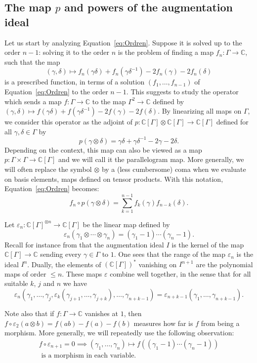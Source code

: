 \documentclass[JEP,XML,SOM,Unicode,NoEqCountersInSection]{cedram}
\theoremstyle{definition}
\newcommand{\CC}{\mathbb{C}}
\begin{document}
\subsection{The map $p$ and powers of the augmentation ideal}

Let us start by analyzing Equation~\eqref{eq:Ordren}. Suppose it is solved
up to the order
$n-1$: solving it to the order
$n$ is the problem of finding
a map $f_n\colon\Gamma\to\CC$, such that the map
\[ (\gamma,\delta)\mapsto f_n(\gamma\delta)+f_n(\gamma\delta^{-1})
-2f_n(\gamma)-2f_n(\delta) \]
is a prescribed function, in terms of a solution
$(f_1,\ldots,f_{n-1})$ of
Equation~\eqref{eq:Ordren} to the order $n-1$.
This suggests to study the operator
which sends a map $f\colon\Gamma\to\CC$ to the map $\Gamma^2\to\CC$ defined by
$(\gamma,\delta)\mapsto f(\gamma\delta)+f(\gamma\delta^{-1})-2f(\gamma)
-2f(\delta)$.
By linearizing all maps on $\Gamma$, we consider this operator as the
adjoint of
$p:\CC[\Gamma]\otimes\CC[\Gamma]\to\CC[\Gamma]$ defined for all
$\gamma,\delta\in \Gamma$ by
\[ p(\gamma\otimes\delta)=\gamma\delta+\gamma\delta^{-1}-2\gamma-2\delta. \]
Depending on the context, this map can also be viewed as a map
$p:\Gamma\times \Gamma\to\CC[\Gamma]$ and we will call it the parallelogram
map. More generally, we will often replace the symbol
$\otimes$ by a (less cumbersome) coma when we evaluate on basis elements,
maps defined on tensor products.
With this notation, Equation~\eqref{eq:Ordren} becomes:
\begin{equation}\label{eq:Oordren}
f_n\circ p(\gamma\otimes\delta) =
\sum_{k=1}^{n-1}f_k(\gamma)f_{n-k}(\delta).
\end{equation}

Let $\varepsilon_n\colon\CC[\Gamma]^{\otimes n}\to\CC[\Gamma]$ be the
linear map defined by
\[ \varepsilon_n(\gamma_1\otimes\cdots\otimes\gamma_n)
=(\gamma_1-1)\cdots(\gamma_n-1). \]
Recall for instance from \cite{Passi} that the augmentation ideal $I$ is the
kernel of the map $\CC[\Gamma]\to\CC$ sending every $\gamma\in \Gamma$ to $1$.
One sees that the range of the map $\varepsilon_n$ is the ideal $I^n$.
Dually, the elements of $(\CC[\Gamma])^*$ vanishing on $I^{n+1}$ are the
polynomial maps of order $\leq n$.
These maps $\varepsilon$ combine well together, in the sense that for all
suitable $k$, $j$ and $n$ we have
\[
\varepsilon_n(\gamma_1,\dots,\gamma_j,
\varepsilon_k(\gamma_{j+1},\dots,\gamma_{j+k}),\dots,\gamma_{n+k-1})=
\varepsilon_{n+k-1}(\gamma_1,\dots,\gamma_{n+k-1}).
\]

Note also that if $f\colon\Gamma\to\CC$ vanishes at $1$, then
$f\circ\varepsilon_2(a\otimes b)=f(ab)-f(a)-f(b)$ measures how far is
$f$ from being a morphism. More generally, we will repeatedly use the
following observation:
\begin{multline}\label{testmulti}
f\circ\varepsilon_{n+1}=0\implies
(\gamma_1,\ldots,\gamma_n)\mapsto f((\gamma_1-1)\cdots(\gamma_n-1))\\[-3pt]
\text{ is a morphism in each variable.}
\end{multline}
\end{document}
